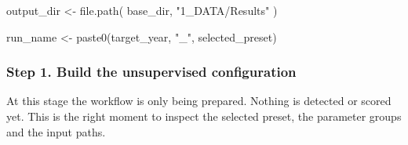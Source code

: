 \documentclass[
  british,
  a4paper,
]{scrbook}
\newenvironment{Shaded}{\begin{snugshade}}{\end{snugshade}}
\newcommand{\FunctionTok}[1]{\textcolor[rgb]{0.28,0.35,0.67}{#1}}
\newcommand{\NormalTok}[1]{\textcolor[rgb]{0.00,0.23,0.31}{#1}}
\newcommand{\OtherTok}[1]{\textcolor[rgb]{0.00,0.23,0.31}{#1}}
\newcommand{\StringTok}[1]{\textcolor[rgb]{0.13,0.47,0.30}{#1}}
\begin{document}
\begin{Shaded}
\begin{Highlighting}[]
\NormalTok{output\_dir }\OtherTok{\textless{}{-}} \FunctionTok{file.path}\NormalTok{(}
\NormalTok{  base\_dir,}
  \StringTok{"1\_DATA/Results"}
\NormalTok{)}

\NormalTok{run\_name }\OtherTok{\textless{}{-}} \FunctionTok{paste0}\NormalTok{(target\_year, }\StringTok{"\_"}\NormalTok{, selected\_preset)}
\end{Highlighting}
\end{Shaded}

\subsubsection{Step 1. Build the unsupervised
configuration}\label{step-1.-build-the-unsupervised-configuration}

At this stage the workflow is only being prepared. Nothing is detected
or scored yet. This is the right moment to inspect the selected preset,
the parameter groups and the input paths.
\end{document}
